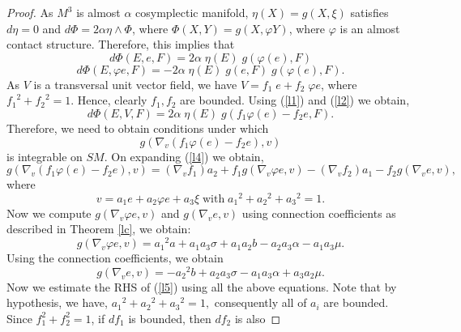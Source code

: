 \documentclass[a4paper, twoside, 10pt]{article}
\numberwithin{equation}{section}
\theoremstyle{definition}
\begin{document}
\begin{proof}
As $M^3$ is almost $\alpha$ cosymplectic manifold,
$\eta(X) = g(X, \xi)$ satisfies  $d \eta = 0$ and 
$d \Phi = 2 \alpha \eta \wedge \Phi$, where 
$\Phi(X,Y) = g(X, \varphi Y)$, where $\varphi$ is an almost contact structure. Therefore, this implies that 
\begin{equation}\label{l1}
d \Phi(E, e, F) = 2 \alpha \; \eta(E) \;  g(\varphi(e), F)
\end{equation}
\begin{equation}\label{l2}
d \Phi(E, \varphi e, F) = - 2 \alpha \; \eta(E) \; g(e, F) 
\; g(\varphi(e), F).
\end{equation}
As $V$ is a transversal unit vector field, we have 
$V = f_1 \; e + f_2 \; \varphi e$, where ${f_1}^2 + {f_2}^2 =1$.  Hence, clearly $f_1, f_2$ are bounded. Using (\ref{l1}) and (\ref{l2}) we obtain,  
\begin{equation}\label{l3}
d \Phi(E, V, F) = 2 \alpha \; \eta(E) \;  g(f_1 \varphi(e) - f_2 e, F).
\end{equation}
Therefore, we need to obtain conditions under which 
\begin{equation}\label{l4}
g\left({\nabla}_{v}(f_1 \varphi(e) - f_2 e), v \right)
\end{equation}
is integrable on $SM$. On expanding (\ref{l4}) we obtain,
\begin{equation}\label{l5}
g\left({\nabla}_{v}(f_1 \varphi(e) - f_2 e), v \right) =
({\nabla}_{v} f_1) a_2 + f_1  g({\nabla}_{v} \varphi e, v)
- ({\nabla}_{v} f_2) a_1 - f_2 g({\nabla}_{v} e, v),
\end{equation}
where $$v = a_1 e + a_2 \varphi e + a_3  \xi \; \mbox{with} \;
{a_1}^2 + {a_2}^2 + {a_3}^2 =1. $$ 
Now we compute $g(\nabla_{v} \varphi e, v)$ and 
$g(\nabla_{v}e, v)$ using connection coefficients as described in Theorem \ref{lc}, we obtain:
\begin{equation}\label{l6}
g({\nabla}_{v} \varphi e, v) = {a_1}^2 a + a_1 a_3 \sigma
+ a_1 a_2 b - a_2 a_3 \alpha - a_1 a_3 \mu.
\end{equation}
Using the connection coefficients, we obtain
\begin{equation}\label{l8}
g({\nabla}_{v} e, v) = - {a_2}^2 b  + a_2 a_3 \sigma - a_1 a_3 \alpha + a_3 a_2 \mu.
\end{equation}
Now we estimate the RHS of (\ref{l5}) using all the above equations. 
Note that by hypothesis, we have, 
${a_1}^2 + {a_2}^2 + {a_3}^2 = 1,$ consequently all
of $a_i$ are bounded. Since $f_1^2 + f_2^2 = 1$, if $df_1$ is bounded, then $df_2$ is also

\end{proof}
\end{document}
